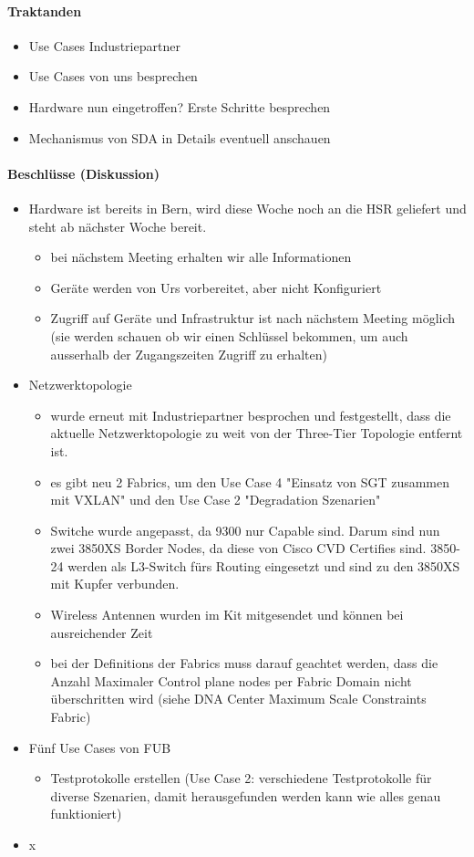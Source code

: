 \paragraph{Traktanden}
\begin{itemize}	
	\item Use Cases Industriepartner
	\item Use Cases von uns besprechen
	\item Hardware nun eingetroffen? Erste Schritte besprechen
	\item Mechanismus von SDA in Details eventuell anschauen
\end{itemize}

\paragraph{Beschlüsse (Diskussion)}
\begin{itemize}	
	\item Hardware ist bereits in Bern, wird diese Woche noch an die HSR geliefert und steht ab nächster Woche bereit.
	\begin{itemize}
		\item bei nächstem Meeting erhalten wir alle Informationen
		\item Geräte werden von Urs vorbereitet, aber nicht Konfiguriert
		\item Zugriff auf Geräte und Infrastruktur ist nach nächstem Meeting möglich (sie werden schauen ob wir einen Schlüssel bekommen, um auch ausserhalb der Zugangszeiten Zugriff zu erhalten)
	\end{itemize}
	\item Netzwerktopologie
	\begin{itemize}
		\item wurde erneut mit Industriepartner besprochen und festgestellt, dass die aktuelle Netzwerktopologie zu weit von der Three-Tier Topologie entfernt ist.
		\item es gibt neu 2 Fabrics, um den Use Case 4 "Einsatz von SGT zusammen mit VXLAN" und den Use Case 2 "Degradation Szenarien"
		\item Switche wurde angepasst, da 9300 nur Capable sind. Darum sind nun zwei 3850XS Border Nodes, da diese von Cisco CVD Certifies sind. 3850-24 werden als L3-Switch fürs Routing eingesetzt und sind zu den 3850XS mit Kupfer verbunden.
		\item Wireless Antennen wurden im Kit mitgesendet und können bei ausreichender Zeit 
		\item bei der Definitions der Fabrics muss darauf geachtet werden, dass die Anzahl Maximaler Control plane nodes per Fabric Domain nicht überschritten wird (siehe DNA Center Maximum Scale Constraints Fabric)
	\end{itemize}
	\item Fünf Use Cases von FUB
	\begin{itemize}
		\item Testprotokolle erstellen (Use Case 2: verschiedene Testprotokolle für diverse Szenarien, damit herausgefunden werden kann wie alles genau funktioniert)
	\end{itemize}
	\item x
\end{itemize}

